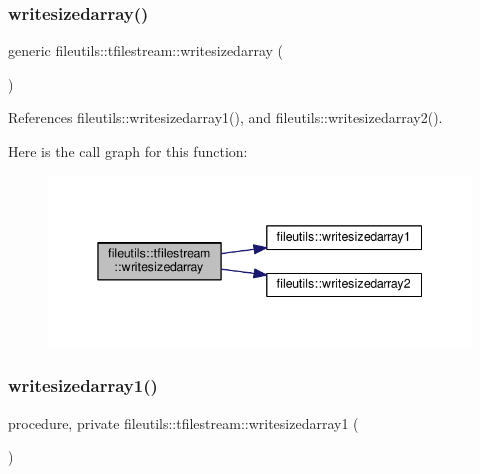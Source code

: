 \mbox{\label{structfileutils_1_1tfilestream_a23afbcc24ec6b7198f05dd16a8cec4e3}} 
\subsubsection{\texorpdfstring{writesizedarray()}{writesizedarray()}}
{\footnotesize\ttfamily generic fileutils\+::tfilestream\+::writesizedarray (\begin{DoxyParamCaption}{ }\end{DoxyParamCaption})\hspace{0.3cm}{\ttfamily [private]}}



References fileutils\+::writesizedarray1(), and fileutils\+::writesizedarray2().

Here is the call graph for this function\+:
\nopagebreak
\begin{figure}[H]
\begin{center}
\leavevmode
\includegraphics[width=342pt]{structfileutils_1_1tfilestream_a23afbcc24ec6b7198f05dd16a8cec4e3_cgraph}
\end{center}
\end{figure}
\mbox{\label{structfileutils_1_1tfilestream_a9057a3261b056d7077da124910b6eaf5}} 
\subsubsection{\texorpdfstring{writesizedarray1()}{writesizedarray1()}}
{\footnotesize\ttfamily procedure, private fileutils\+::tfilestream\+::writesizedarray1 (\begin{DoxyParamCaption}{ }\end{DoxyParamCaption})\hspace{0.3cm}{\ttfamily [private]}}

